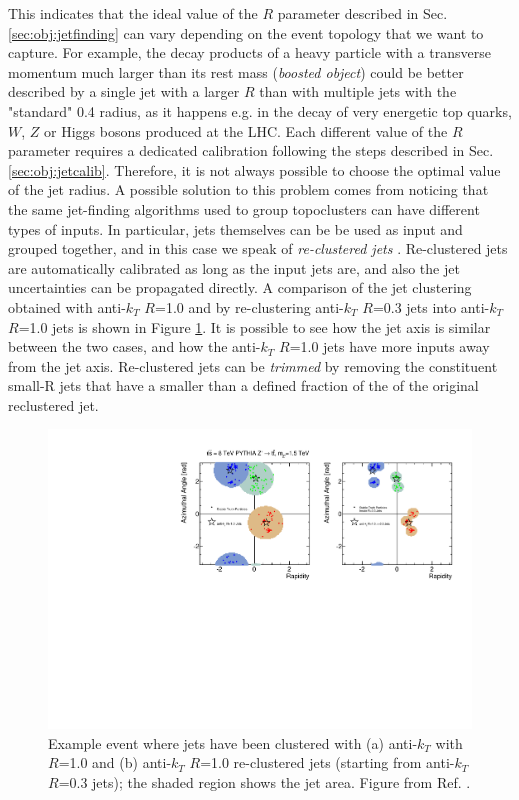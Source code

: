 This indicates that the ideal value of the $R$ parameter described in Sec. \ref{sec:obj:jetfinding} can vary depending on the event topology that we want to capture. 
For example, the decay products of a heavy particle with a transverse momentum much larger than its rest mass (\textit{boosted object}) could be better described by a 
single jet with a larger $R$ than with multiple jets with the "standard" 0.4 radius, 
as it happens e.g. in the decay of very energetic top quarks, $W$, $Z$ or Higgs bosons produced at the LHC.
Each different value of the $R$ parameter requires a dedicated calibration following the steps described in Sec. \ref{sec:obj:jetcalib}. 
Therefore, it is not always possible to choose the optimal value of the jet radius. 
A possible solution to this problem comes from noticing that the same jet-finding algorithms used to group topoclusters can have different types of inputs. 
In particular, jets themselves can be be used as input and grouped together, and in this case we speak of \textit{re-clustered jets} \cite{Nachman:2014kla}. 
Re-clustered jets are automatically calibrated as long as the input jets are, and also the jet uncertainties can be propagated directly. 
A comparison of the jet clustering obtained with anti-$k_T$ $R$=1.0 and by re-clustering anti-$k_T$ $R$=0.3 jets into anti-$k_T$ $R$=1.0 jets 
is shown in Figure \ref{fig:recluster}. It is possible to see how the jet axis is similar between the two cases, and how the anti-$k_T$ $R$=1.0 jets have more inputs away from the jet axis.
Re-clustered jets can be \textit{trimmed} by removing the constituent small-R jets that have a \pt smaller than a defined fraction of the \pt of the original reclustered jet. 


\begin{figure}[h]
\begin{center}
\includegraphics[width=1.0\textwidth]{./figures/objects/reclustered.pdf}
\end{center}
\caption{Example event where jets have been clustered with (a) anti-$k_T$ with $R$=1.0 and (b) anti-$k_T$ $R$=1.0 re-clustered jets (starting from anti-$k_T$ $R$=0.3 jets); the shaded region shows the jet area. Figure from Ref. \cite{Nachman:2014kla}.}
\label{fig:recluster}
\end{figure}

